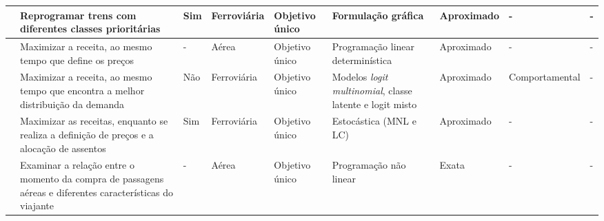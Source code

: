 \begin{center}
\begin{longtable}{|M{2cm}|M{3.3cm}|M{0.5cm}|M{1.1cm}|M{1cm}|M{1.7cm}|M{1.7cm}|M{1.7cm}|M{1.5cm}|}
		\citep{CORMAN201114}      &  Reprogramar trens com diferentes classes prioritárias                                                                                                & Sim                 & Ferroviária          &  Objetivo único          &  Formulação gráfica                                      & Aproximado                                      & -                        & -                                                         \\ \hline
		\citep{Erdelyi2011}       &  Maximizar a receita, ao mesmo tempo que define os preços                                                                                             & -                   & Aérea                &  Objetivo único          &  Programação linear determinística                       & Aproximado                                      & -                        & -                                                         \\ \hline
		\citep{HETRAKUL20131}     &  Maximizar a receita, ao mesmo tempo que encontra a melhor distribuição da demanda                                                                    & Não                 & Ferroviária          &  Objetivo único          &  Modelos \textit{logit multinomial}, classe latente e logit misto & Aproximado                                      & Comportamental           & -                                                         \\ \hline
		\citep{HETRAKUL201468}    &  Maximizar as receitas, enquanto se realiza a definição de preços e a alocação de assentos                                                            & Sim                 & Ferroviária          &  Objetivo único          &  Estocástica (MNL e LC)                                  & Aproximado                                      & -                        & -                                                         \\ \hline
		\citep{WEN201791}         &  Examinar a relação entre o momento da compra de passagens aéreas e diferentes características do viajante                                            & -                   & Aérea                &  Objetivo único          &  Programação não linear                                  & Exata                                           & -                        & -                                                         \\ \hline

\end{longtable}
\end{center}
